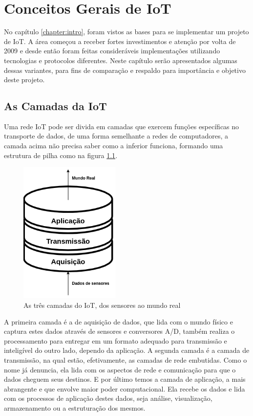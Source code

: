 \chapter{Conceitos Gerais de IoT}
\label{chapter:coneceitos}

No capítulo \ref{chapter:intro}, foram vistos as bases para se implementar um projeto de IoT. A área começou a receber fortes investimentos e atenção por volta de 2009 e desde então foram feitas consideráveis implementações utilizando tecnologias e protocolos diferentes. Neste capítulo serão apresentados algumas dessas variantes, para fins de comparação e respaldo para importância e objetivo deste projeto.

\section{As Camadas da IoT}
\label{section:camadas_iot}

Uma rede IoT pode ser divida em camadas que exercem funções específicas no transporte de dados, de uma forma semelhante a redes de computadores, a camada acima não precisa saber como a inferior funciona, formando uma estrutura de pilha como na figura \ref{fig:1.2.0/camadas_iot}.

\begin{figure}[h!]
\centering
\includegraphics[width=5cm]{./02_Capitulos/02_Cap1/figures/iot_stack}
\caption{As três camadas do IoT, dos sensores ao mundo real}
\label{fig:1.2.0/camadas_iot}
\end{figure}

A primeira camada é a de aquisição de dados, que lida com o mundo físico e captura estes dados através de sensores e conversores A/D, também realiza o processamento para entregar em um formato adequado para transmissão e inteligível do outro lado, dependo da aplicação. A segunda camada é a camada de transmissão, na qual estão, efetivamente, as camadas de rede embutidas. Como o nome já denuncia, ela lida com os aspectos de rede e comunicação para que o dados cheguem seus destinos. E por último temos a camada de aplicação, a mais abrangente e que envolve maior poder computacional. Ela recebe os dados e lida com os processos de aplicação destes dados, seja análise, visualização, armazenamento ou a estruturação dos mesmos.

